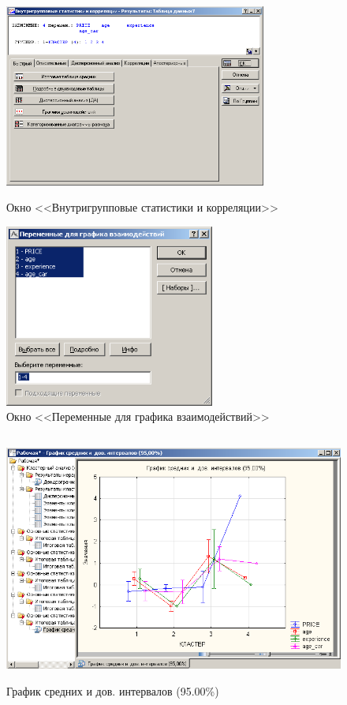 \begin{figure}[!ph]
  \centering
  \begin{minipage}{0.49\textwidth}
    \centering

    \includegraphics[height=6cm]
    {inc/cars_my/3.12.PNG}

    \caption{Окно <<Внутригрупповые статистики и корреляции>>}
    \label{fig:3_12}
  \end{minipage}
  \begin{minipage}{0.49\textwidth}
    \centering

    \includegraphics[height=6cm]
    {inc/cars_my/3.13.PNG}

    \caption{Окно <<Переменные для графика взаимодействий>>}
    \label{fig:3_13}
  \end{minipage}
\end{figure}

\begin{figure}[!ph]
  \centering

  \includegraphics[height=8.2cm]
  {inc/cars_my/3.14.PNG}

  \caption{График средних и дов. интервалов (95.00\%)}
  \label{fig:3_14}
\end{figure}


